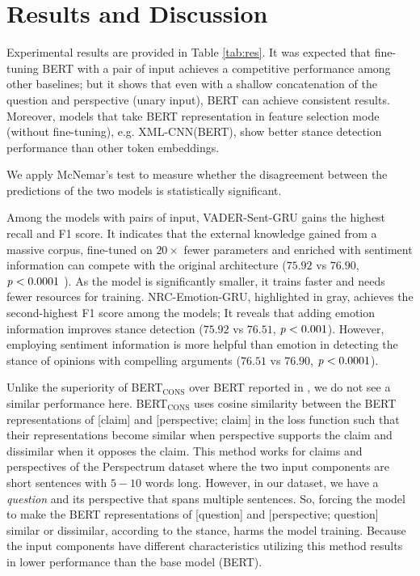 \documentclass[11pt,a4paper]{article}
\begin{document}
\section{Results and Discussion}
\label{experiment}
Experimental results are provided in Table \ref{tab:res}. It was expected that fine-tuning BERT with a pair of input achieves a competitive performance among other baselines; but it shows that even with a shallow concatenation of the question and perspective (unary input), BERT can achieve consistent results. Moreover, models that take BERT representation in feature selection mode (without fine-tuning), e.g. XML-CNN(BERT), show better stance detection performance than other token embeddings.

 
 We apply McNemar's test to measure whether the disagreement between the predictions of the two models is statistically significant.
 
 Among the models with pairs of input, VADER-Sent-GRU gains the highest recall and F1 score. It indicates that the external knowledge gained from a massive corpus, fine-tuned on $20\times$ fewer parameters and enriched with sentiment information can compete with the original architecture ($75.92$ vs $76.90$, $\text{\emph{p}}< 0.0001$ ). As the model is significantly smaller, it trains faster and needs fewer resources for training.
NRC-Emotion-GRU, highlighted in gray, achieves the second-highest F1 score among the models; It reveals that adding emotion information improves stance detection ($75.92$ vs $76.51$, $\text{\emph{p}} < 0.001$). However, employing sentiment information is more helpful than emotion in detecting the stance of opinions with compelling arguments ($76.51$ vs $76.90$, $\text{\emph{p}} < 0.0001$).

Unlike the superiority of BERT$_\text{CONS}$ over BERT reported in \cite{Popat2019STANCYSC}, we do not see a similar performance here. BERT$_\text{CONS}$ uses cosine similarity between the BERT representations of [claim] and  [perspective; claim] in the loss function such that their representations become similar when perspective supports the claim and dissimilar when it opposes the claim. This method works for claims and perspectives of the Perspectrum dataset where the two input components are short sentences with  $5-10$ words long. However, in our dataset, we have a \textit{question} and its perspective that spans multiple sentences. So, forcing the model to make the BERT representations of [question] and  [perspective; question] similar or dissimilar, according to the stance, harms the model training. Because the input components have different characteristics utilizing this method results in lower performance than the base model (BERT). 
\end{document}
